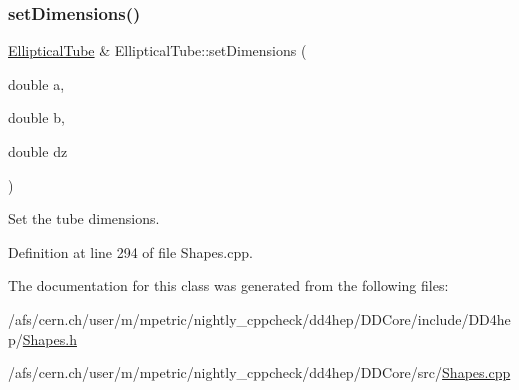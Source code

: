 \subsubsection{\texorpdfstring{set\+Dimensions()}{setDimensions()}}
{\footnotesize\ttfamily \hyperlink{class_d_d4hep_1_1_geometry_1_1_elliptical_tube}{Elliptical\+Tube} \& Elliptical\+Tube\+::set\+Dimensions (\begin{DoxyParamCaption}\item[{double}]{a,  }\item[{double}]{b,  }\item[{double}]{dz }\end{DoxyParamCaption})}



Set the tube dimensions. 



Definition at line 294 of file Shapes.\+cpp.



The documentation for this class was generated from the following files\+:\begin{DoxyCompactItemize}
\item 
/afs/cern.\+ch/user/m/mpetric/nightly\+\_\+cppcheck/dd4hep/\+D\+D\+Core/include/\+D\+D4hep/\hyperlink{_shapes_8h}{Shapes.\+h}\item 
/afs/cern.\+ch/user/m/mpetric/nightly\+\_\+cppcheck/dd4hep/\+D\+D\+Core/src/\hyperlink{_shapes_8cpp}{Shapes.\+cpp}\end{DoxyCompactItemize}
